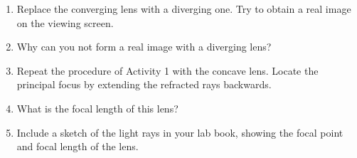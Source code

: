 \begin{enumerate}[labparts]
\item Replace the converging lens with a diverging one. Try to obtain a
real image on the viewing screen.

\item Why can you not form a real image with a diverging lens?\vspace{25mm}

\item Repeat the procedure of Activity 1 with the concave
lens. Locate the principal focus by extending the refracted rays backwards.

\item What is the focal length of this lens?\vspace{10mm}
\item Include a sketch of the light rays in your lab book, showing the focal 
point and focal length of the lens.
\end{enumerate}
